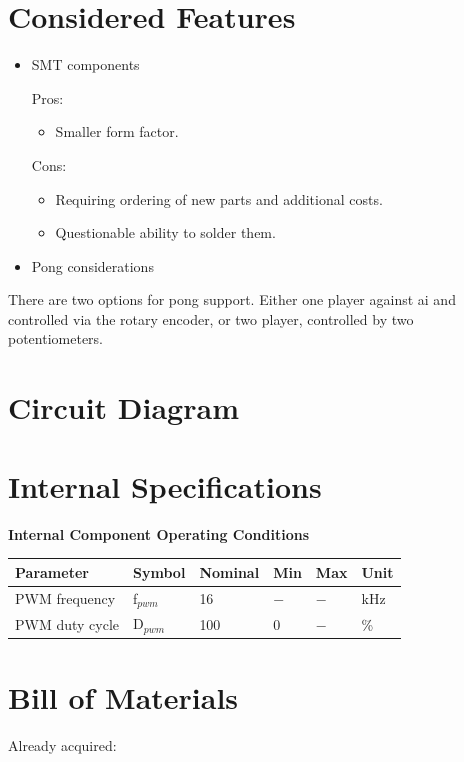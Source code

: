 \documentclass{article}
\begin{document}
\section{Considered Features}

\begin{itemize}
	\item SMT components

	Pros:
	\begin{itemize}
		\item Smaller form factor.
	\end{itemize}
	Cons:
	\begin{itemize}
		\item Requiring ordering of new parts and additional costs.
		\item Questionable ability to solder them.
	\end{itemize}

	\item Pong considerations
\end{itemize}
There are two options for pong support. Either one player against ai and controlled via
the rotary encoder, or two player, controlled by two potentiometers.


\section{Circuit Diagram}

\section{Internal Specifications}
\begin{center}
	\textbf{Internal Component Operating Conditions}\\
	\begin{tabular}{ |p{5cm}||p{1.5cm}|p{1.5cm}|p{1cm}|p{1cm}|p{2cm}|}
		\hline
		\textbf{Parameter}&\textbf{Symbol}&\textbf{Nominal}&\textbf{Min}&\textbf{Max}&\textbf{Unit}\\
		\hline\hline
		PWM frequency		& f$_{pwm}$	&	16	&	$-$	&	$-$	&	kHz	\\
		PWM duty cycle		& D$_{pwm}$	&	100	&	0	&	$-$	&	\%	\\
		\hline
	\end{tabular}
\end{center}



\section{Bill of Materials}
Already acquired:
\end{document}
